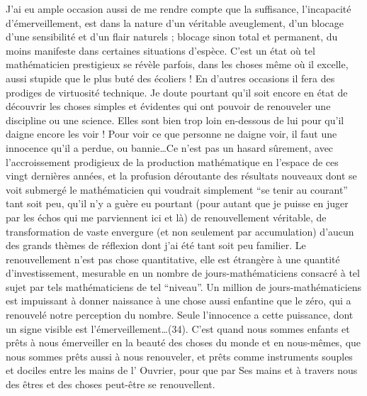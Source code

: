 {J'ai eu ample occasion aussi de me rendre compte que la suffisance, l'incapacité d'émerveillement, est dans la nature d'un véritable aveuglement, d'un blocage d'une sensibilité et d'un flair naturels ; blocage sinon total et permanent, du moins manifeste dans certaines situations d'espèce. C'est un état où tel mathématicien prestigieux se révèle parfois, dans les choses même où il excelle, aussi stupide que le plus buté des écoliers ! En d'autres occasions il fera des prodiges de virtuosité technique. Je doute pourtant qu'il soit encore en état de découvrir les choses simples et évidentes qui ont pouvoir de renouveler une discipline ou une science. Elles sont bien trop loin en-dessous de lui pour qu'il daigne encore les voir ! Pour voir ce que personne ne daigne voir, il faut une innocence qu'il a perdue, ou bannie\ldots Ce n'est pas un hasard sûrement, avec l'accroissement prodigieux de la production mathématique en l'espace de ces vingt dernières années, et la profusion déroutante des résultats nouveaux dont se voit submergé le mathématicien qui voudrait simplement ``se tenir au courant'' tant soit peu, qu'il n'y a guère eu pourtant (pour autant que je puisse en juger par les échos qui me parviennent ici et là) de renouvellement véritable, de transformation de vaste envergure (et non seulement par accumulation) d'aucun des grands thèmes de réflexion dont j'ai été tant soit peu familier. Le renouvellement n'est pas chose quantitative, elle est étrangère à une quantité d'investissement, mesurable en un nombre de jours-mathématiciens consacré à tel sujet par tels mathématiciens de tel ``niveau''. Un million de jours-mathématiciens est impuissant à donner naissance à une chose aussi enfantine que le zéro, qui a renouvelé notre perception du nombre. Seule l'innocence a cette puissance, dont un signe visible est l'émerveillement\ldots}(34). C'est quand nous sommes enfants et prêts à nous émerveiller en la beauté des choses du monde et en nous-mêmes, que nous sommes prêts aussi à nous renouveler, et prêts comme instruments souples et dociles entre les mains de l' Ouvrier, pour que par Ses mains et à travers nous des êtres et des choses peut-être se renouvellent.

